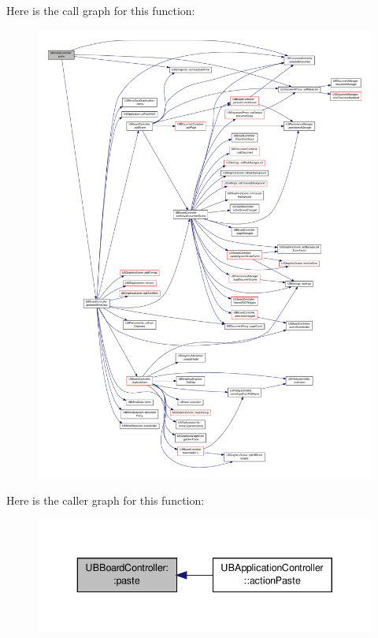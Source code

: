 Here is the call graph for this function\-:
\nopagebreak
\begin{figure}[H]
\begin{center}
\leavevmode
\includegraphics[width=350pt]{d7/d62/class_u_b_board_controller_a68518a98107e994551da0a4e3a79fe2c_cgraph}
\end{center}
\end{figure}




Here is the caller graph for this function\-:
\nopagebreak
\begin{figure}[H]
\begin{center}
\leavevmode
\includegraphics[width=340pt]{d7/d62/class_u_b_board_controller_a68518a98107e994551da0a4e3a79fe2c_icgraph}
\end{center}
\end{figure}


